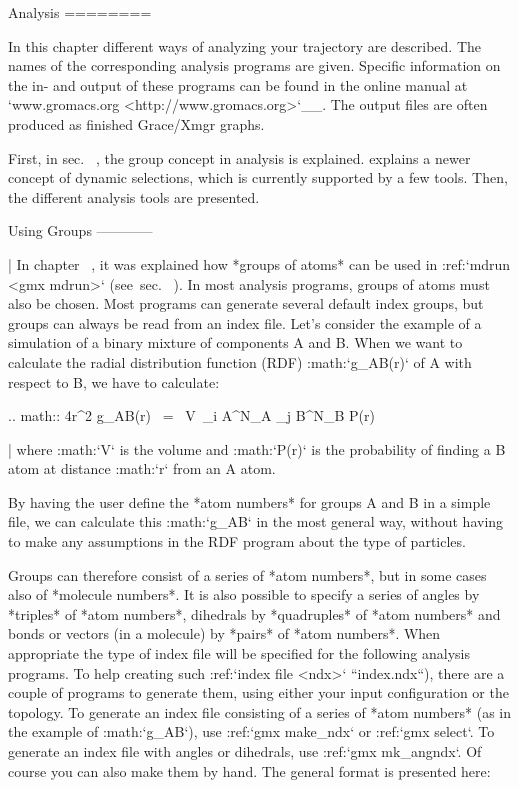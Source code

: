 Analysis
========

In this chapter different ways of analyzing your trajectory are
described. The names of the corresponding analysis programs are given.
Specific information on the in- and output of these programs can be
found in the online manual at
`www.gromacs.org <http://www.gromacs.org>`__. The output files are often
produced as finished Grace/Xmgr graphs.

First, in sec. 
, the group concept in
analysis is explained. 
explains a
newer concept of dynamic selections, which is currently supported by a
few tools. Then, the different analysis tools are presented.

Using Groups
------------

| In chapter 
  , it was explained how
  *groups of atoms* can be used in :ref:`mdrun <gmx mdrun>`
  (see sec. 
  ). In most analysis
  programs, groups of atoms must also be chosen. Most programs can
  generate several default index groups, but groups can always be read
  from an index file. Let’s consider the example of a simulation of a
  binary mixture of components A and B. When we want to calculate the
  radial distribution function (RDF) :math:`g_{AB}(r)` of A with respect
  to B, we have to calculate:

  .. math:: 4\pi r^2 g_{AB}(r)      ~=~     V~\sum_{i \in A}^{N_A} \sum_{j \in B}^{N_B} P(r)

| where :math:`V` is the volume and :math:`P(r)` is the probability of
  finding a B atom at distance :math:`r` from an A atom.

By having the user define the *atom numbers* for groups A and B in a
simple file, we can calculate this :math:`g_{AB}` in the most general
way, without having to make any assumptions in the RDF program about the
type of particles.

Groups can therefore consist of a series of *atom numbers*, but in some
cases also of *molecule numbers*. It is also possible to specify a
series of angles by *triples* of *atom numbers*, dihedrals by
*quadruples* of *atom numbers* and bonds or vectors (in a molecule) by
*pairs* of *atom numbers*. When appropriate the type of index file will
be specified for the following analysis programs. To help creating such
:ref:`index file <ndx>` ``index.ndx``), there are a couple of programs to generate
them, using either your input configuration or the topology. To generate
an index file consisting of a series of *atom numbers* (as in the
example of :math:`g_{AB}`), use :ref:`gmx make_ndx`
or :ref:`gmx select`. To generate an index file with
angles or dihedrals, use :ref:`gmx mk_angndx`. Of course you can also
make them by hand. The general format is presented here:

